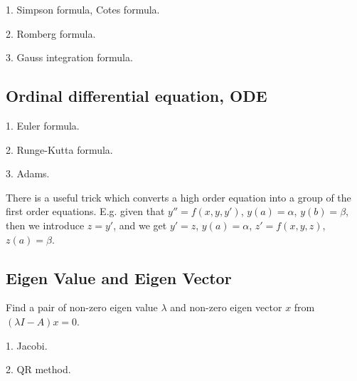 1. Simpson formula, Cotes formula.

2. Romberg formula.

3. Gauss integration formula.

\subsection{Ordinal differential equation, ODE}

1. Euler formula.

2. Runge-Kutta formula.

3. Adams.

There is a useful trick which converts a high order equation into a group
of the first order equations. E.g. given that $ y'' = f(x,y,y') $,
$y(a)=\alpha$, $y(b)=\beta$, then we introduce $z=y'$,
and we get $y'=z$, $y(a)=\alpha$, $z'=f(x,y,z)$, $z(a)=\beta$.

\subsection{Eigen Value and Eigen Vector}

Find a pair of non-zero eigen value $\lambda$ and non-zero eigen vector $x$ from
$(\lambda I - A)x = 0$.

1. Jacobi.

2. QR method.
